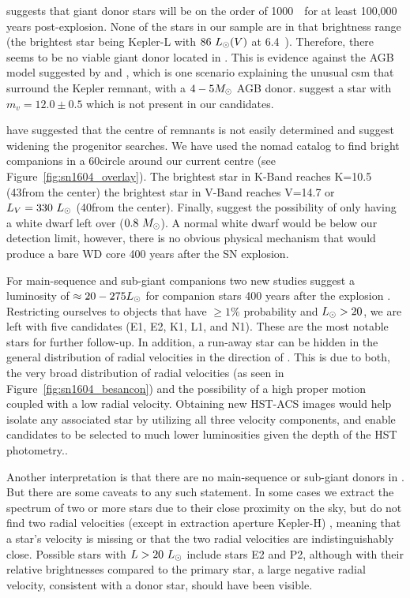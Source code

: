 \documentclass[preprint2]{aastex}
\begin{document}
\citet{2000ApJS..128..615M} suggests that giant donor stars will be on the order of 1000~\lsun\  for at least 100,000 years post-explosion. None of the stars in our sample are in that brightness range (the brightest star being Kepler-L with $86~\hbox{$L_{\odot}$}(V)$ at 6.4~\kpc). Therefore, there seems to be no viable giant donor located in . This is evidence against the AGB model suggested by \citet{2012A&A...537A.139C} and \citet{2013ApJ...764...63B}, which is one scenario explaining the unusual \gls{csm} that surround the Kepler remnant, with a $4 - 5 \hbox{$M_{\odot}$}$ AGB donor. \citet{2012A&A...537A.139C} suggest a star with $m_v=12.0 \pm 0.5$ which is not present in our candidates. 

\cite{2013arXiv1305.0567W} have suggested that the centre of remnants is not easily determined and suggest widening the progenitor searches. We have used the \gls{nomad} catalog to find bright companions in a 60\arcsec circle around our current centre (see Figure~\ref{fig:sn1604_overlay}). The brightest star in K-Band reaches K=10.5 (43\arcsec from the center)  the brightest star in V-Band reaches V=14.7 or $L_V=330~\hbox{$L_{\odot}$}$ (40\arcsec from the center).   Finally, \citet{2012A&A...537A.139C}  suggest the possibility of only having a white dwarf left over ($0.8~\hbox{$M_{\odot}$}$).  A normal white dwarf would be below our detection limit, however, there is no obvious physical mechanism that would produce a bare WD core 400 years after the SN explosion.

For main-sequence and sub-giant companions two new studies  \citep{2012arXiv1205.5028S,2012ApJ...760...21P} suggest a luminosity of $\approx 20 - 275 \hbox{$L_{\odot}$}$ for companion stars 400 years after the explosion \citep[see Figure~6 in ][]{2012ApJ...760...21P}. Restricting ourselves to objects that have $\ge 1 \%$ probability and $\hbox{$L_{\odot}$} > 20$, we are left with five candidates (E1, E2, K1, L1, and N1). These are the most notable stars for further follow-up. In addition, a run-away star can be hidden in the general distribution of radial velocities in the direction of . This is due to both, the very broad distribution of radial velocities (as seen in Figure~\ref{fig:sn1604_besancon}) and the possibility of a high proper motion coupled with a low radial velocity. Obtaining new HST-ACS images would help isolate any associated star by utilizing all three velocity components, and enable candidates to be selected to much lower luminosities given the depth of the HST photometry.. 

Another interpretation is that there are no main-sequence or sub-giant donors in . But there are some caveats to any such statement.  In some cases we extract the spectrum of two or more stars due to their close proximity on the sky, but do not find two radial velocities (except in extraction aperture Kepler-H) , meaning that a star's velocity is missing or that the two radial velocities are indistinguishably close. Possible stars with $L>20~\hbox{$L_{\odot}$}$ include stars E2 and P2, although with their relative brightnesses compared to the primary star, a large negative radial velocity, consistent with a donor star, should have been visible.
 
\end{document}
